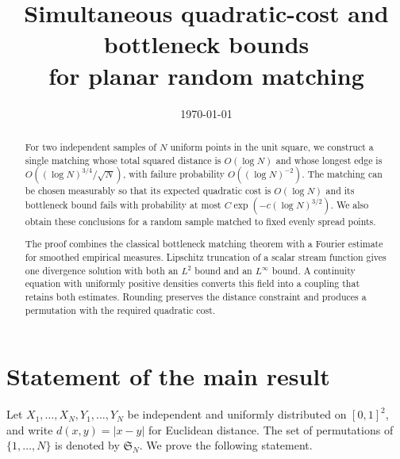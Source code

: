 \documentclass[11pt]{article}
\title{Simultaneous quadratic-cost and bottleneck bounds\\for planar random matching}
\author{}
\date{\today}
\theoremstyle{remark}
\numberwithin{equation}{section}
\begin{document}
\maketitle

\begin{abstract}
For two independent samples of \(N\) uniform points in the unit square,
we construct a single matching whose total squared distance is
\(O(\log N)\) and whose longest edge is
\(O((\log N)^{3/4}/\sqrt N)\), with failure probability
\(O((\log N)^{-2})\). The matching can be chosen measurably so that its
expected quadratic cost is \(O(\log N)\) and its bottleneck bound fails
with probability at most \(C\exp(-c(\log N)^{3/2})\). We also obtain
these conclusions for a random sample matched to fixed evenly spread
points.

The proof combines the classical bottleneck matching theorem with a
Fourier estimate for smoothed empirical measures. Lipschitz truncation
of a scalar stream function gives one divergence solution with both
an \(L^2\) bound and an \(L^\infty\) bound. A continuity equation with
uniformly positive densities converts this field into a coupling that
retains both estimates. Rounding preserves the distance constraint and
produces a permutation with the required quadratic cost.
\end{abstract}

\section{Statement of the main result}\label{sec:statement}

Let \(X_1,\ldots,X_N,Y_1,\ldots,Y_N\) be independent and uniformly distributed on \([0,1]^2\), and write \(d(x,y)=|x-y|\) for Euclidean distance. The set of permutations of \(\{1,\ldots,N\}\) is denoted by \(\mathfrak S_N\). We prove the following statement.
\end{document}
